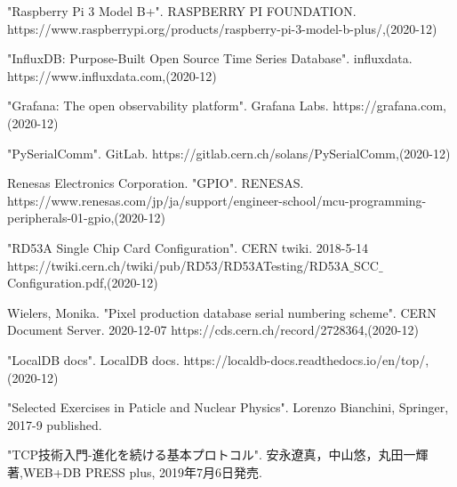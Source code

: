 \begin{thebibliography}{9}
"Raspberry Pi 3 Model B+". RASPBERRY PI FOUNDATION. 
https://www.raspberrypi.org/products/raspberry-pi-3-model-b-plus/,(2020-12)

"InfluxDB: Purpose-Built Open Source Time Series Database". influxdata. 
https://www.influxdata.com,(2020-12)

"Grafana: The open observability platform". Grafana Labs. 
https://grafana.com,(2020-12)

"PySerialComm". GitLab. 
https://gitlab.cern.ch/solans/PySerialComm,(2020-12)

Renesas Electronics Corporation. "GPIO". RENESAS.  
https://www.renesas.com/jp/ja/support/engineer-school/mcu-programming-peripherals-01-gpio,(2020-12)

"RD53A Single Chip Card Configuration". CERN twiki. 2018-5-14 
https://twiki.cern.ch/twiki/pub/RD53/RD53ATesting/RD53A$\_$SCC$\_$Configuration.pdf,(2020-12)

Wielers, Monika. "Pixel production database serial numbering scheme". CERN Document Server. 2020-12-07
https://cds.cern.ch/record/2728364,(2020-12)

"LocalDB docs". LocalDB docs. 
https://localdb-docs.readthedocs.io/en/top/,(2020-12)

"Selected Exercises in Paticle and Nuclear Physics".
Lorenzo Bianchini, Springer, 2017-9 published.

"TCP技術入門-進化を続ける基本プロトコル".
安永遼真，中山悠，丸田一輝著,WEB+DB PRESS plus, 2019年7月6日発売.

\end{thebibliography}
